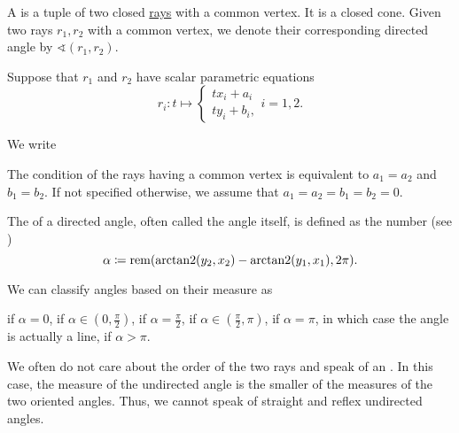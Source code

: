 \begin{definition}\label{def:angle}
  A  is a tuple of two closed \hyperref[def:geometric_ray]{rays} with a common vertex. It is a closed cone. Given two rays \( r_1, r_2 \) with a common vertex, we denote their corresponding directed angle by \( \sphericalangle(r_1, r_2) \).

  Suppose that \( r_1 \) and \( r_2 \) have scalar parametric equations
  \begin{equation*}
    r_i: t \mapsto
    \begin{cases}
      tx_i + a_i \\
      ty_i + b_i,
    \end{cases}
    i = 1, 2.
  \end{equation*}

  We write

  The condition of the rays having a common vertex is equivalent to \( a_1 = a_2 \) and \( b_1 = b_2 \). If not specified otherwise, we assume that \( a_1 = a_2 = b_1 = b_2 = 0 \).

  The  of a directed angle, often called the angle itself, is defined as the number (see )
  \begin{equation}\label{eq:def:angle/measure}
    \alpha \coloneqq \operatorname{rem}(\operatorname{arctan2}(y_2, x_2) - \operatorname{arctan2}(y_1, x_1), 2\pi).
  \end{equation}

  We can classify angles based on their measure as
  \begin{thmenum}
      if \( \alpha = 0 \),
      if \( \alpha \in (0, \tfrac \pi 2) \),
      if \( \alpha = \tfrac \pi 2 \),
      if \( \alpha \in (\tfrac \pi 2, \pi) \),
      if \( \alpha = \pi \), in which case the angle is actually a line,
      if \( \alpha > \pi \).
  \end{thmenum}

  We often do not care about the order of the two rays and speak of an . In this case, the measure of the undirected angle is the smaller of the measures of the two oriented angles. Thus, we cannot speak of straight and reflex undirected angles.
\end{definition}

